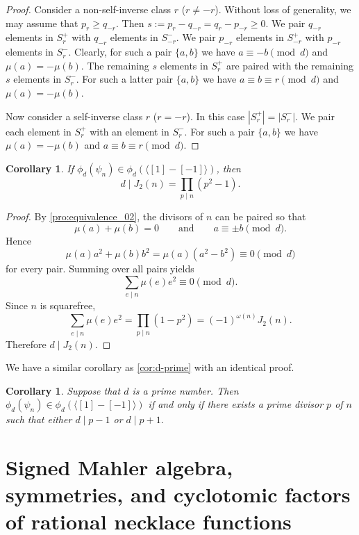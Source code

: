 \documentclass[12t,a4paper]{amsart}
\newtheorem{cor}[thm]{Corollary}
\theoremstyle{definition}
\numberwithin{equation}{section}
\begin{document}
{\begin{proof}
Consider a non-self-inverse class $r$ ($r\not=-r$).
Without loss of generality, we may assume that $p_r \geq q_{-r}$. 
Then $s:=p_r-q_{-r}=q_{r}-p_{-r}\geq0$. We pair $q_{-r}$ elements in $S_r^+$ with $q_{-r}$ elements in $S_{-r}^-$.
We pair $p_{-r}$ elements in $S_{-r}^+$ with $p_{-r}$ elements in $S_{r}^-$. Clearly, for such a pair $\{a,b\}$ we have $a\equiv -b\pmod d$ and $\mu(a)=-\mu(b)$. 
The remaining $s$ elements in $S_r^{+}$ are paired with the remaining $s$ elements in $S_{r}^{-}$. For such a latter pair $\{a,b\}$ we have $a\equiv b\equiv r\pmod d$ and $\mu(a)=-\mu(b)$. 

Now consider a self-inverse class $r$ ($r=-r$). In this case $|S_r^+|=|S_r^-|$. We pair each element in $S_r^+$ with an element in $S_r^-$.  For such a pair $\{a,b\}$ we have $\mu(a)=-\mu(b)$ and $a\equiv b\equiv r\pmod d$. 
\end{proof}

\begin{cor}
If \(\phi_d(\psi_n)\in \phi_d(\langle [1]-[-1]\rangle)\), then
\[
d\mid J_2(n)=\prod_{p\mid n}(p^2-1).
\]
\end{cor}

\begin{proof}
By \cref{pro:equivalence_02}, the divisors of \(n\) can be paired so that
\[
\mu(a)+\mu(b)=0
\qquad\text{and}\qquad
a\equiv \pm b \pmod d.
\]
Hence
\[
\mu(a)a^2+\mu(b)b^2
=\mu(a)(a^2-b^2)
\equiv 0 \pmod d
\]
for every pair. Summing over all pairs yields
\[
\sum_{e\mid n}\mu(e)e^2\equiv 0 \pmod d.
\]
Since \(n\) is squarefree,
\[
\sum_{e\mid n}\mu(e)e^2
=
\prod_{p\mid n}(1-p^2)
=
(-1)^{\omega(n)}J_2(n).
\]
Therefore \(d\mid J_2(n)\).
\end{proof}

{
We have a similar corollary as \cref{cor:d-prime} with an identical proof. 

\begin{cor}
    Suppose that $d$ is a prime number. Then $\phi_d(\psi_n)\in \phi_d(\langle [1] - [-1] \rangle)$ if and only if there exists a prime divisor $p$ of $n$ such that either $d \mid p-1$ or $d \mid p+1.$
\end{cor}

}








\section{Signed Mahler algebra, symmetries, and cyclotomic factors of rational necklace functions} \label{sec:signed-mahler}

}
\end{document}
